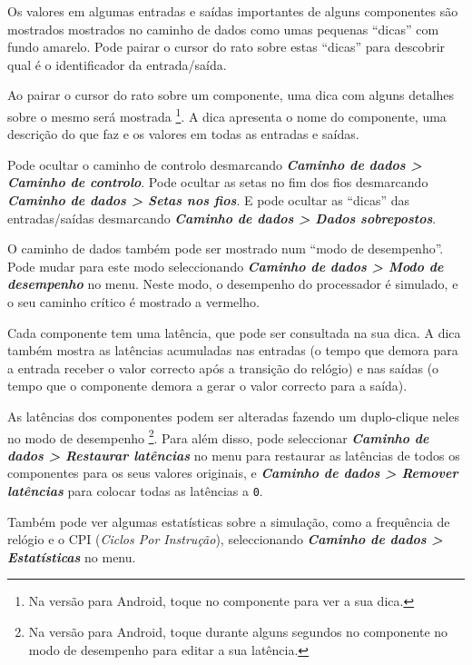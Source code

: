 \documentclass[11pt,a4paper,twoside,titlepage]{article}
\newcommand{\menupath}[1]{\textbf{\emph{#1}}}
\begin{document}
Os valores em algumas entradas e saídas importantes de alguns componentes são
mostrados mostrados no caminho de dados como umas pequenas ``dicas'' com 
fundo amarelo.
Pode pairar o cursor do rato sobre estas ``dicas'' para descobrir qual é o
identificador da entrada/saída.

Ao pairar o cursor do rato sobre um componente, uma dica com alguns detalhes
sobre o mesmo será mostrada \footnote{Na versão para Android, toque no
componente para ver a sua dica.}.
A dica apresenta o nome do componente, uma descrição do que faz e os valores
em todas as entradas e saídas.

Pode ocultar o caminho de controlo desmarcando
\menupath{Caminho de dados > Caminho de controlo}.
Pode ocultar as setas no fim dos fios desmarcando
\menupath{Caminho de dados > Setas nos fios}.
E pode ocultar as ``dicas'' das entradas/saídas desmarcando
\menupath{Caminho de dados > Dados sobrepostos}.

\bigskip

O caminho de dados também pode ser mostrado num ``modo de desempenho''.
Pode mudar para este modo seleccionando 
\menupath{Caminho de dados > Modo de desempenho} no menu.
Neste modo, o desempenho do processador é simulado, e o seu caminho crítico
é mostrado a vermelho.

Cada componente tem uma latência, que pode ser consultada na sua dica.
A dica também mostra as latências acumuladas nas entradas (o tempo que
demora para a entrada receber o valor correcto após a transição do relógio)
e nas saídas (o tempo que o componente demora a gerar o valor correcto para
a saída).

As latências dos componentes podem ser alteradas fazendo um duplo-clique
neles no modo de desempenho \footnote{Na versão para Android, toque durante
alguns segundos no componente no modo de desempenho para editar a sua
latência.}.
Para além disso, pode seleccionar 
\menupath{Caminho de dados > Restaurar latências} no menu para restaurar as
latências de todos os componentes para os seus valores originais, e
\menupath{Caminho de dados > Remover latências} para colocar todas as
latências a \verb+0+.

Também pode ver algumas estatísticas sobre a simulação, como a frequência de
relógio e o CPI (\emph{Ciclos Por Instrução}), seleccionando
\menupath{Caminho de dados > Estatísticas} no menu.
\end{document}
